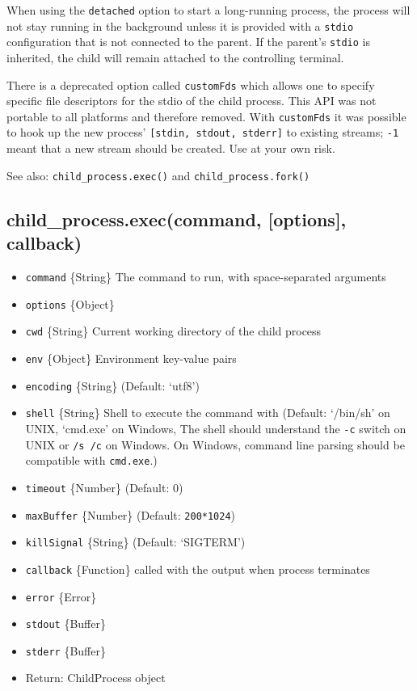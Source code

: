 When using the \texttt{detached} option to start a long-running process,
the process will not stay running in the background unless it is
provided with a \texttt{stdio} configuration that is not connected to
the parent. If the parent's \texttt{stdio} is inherited, the child will
remain attached to the controlling terminal.

There is a deprecated option called \texttt{customFds} which allows one
to specify specific file descriptors for the stdio of the child process.
This API was not portable to all platforms and therefore removed. With
\texttt{customFds} it was possible to hook up the new process'
\texttt{{[}stdin, stdout, stderr{]}} to existing streams; \texttt{-1}
meant that a new stream should be created. Use at your own risk.

See also: \texttt{child\_process.exec()} and
\texttt{child\_process.fork()}

\subsection{child\_process.exec(command, {[}options{]},
callback)}\label{childux5fprocess.execcommand-options-callback}

\begin{itemize}
\itemsep1pt\parskip0pt
\item
  \texttt{command} \{String\} The command to run, with space-separated
  arguments
\item
  \texttt{options} \{Object\}
\item
  \texttt{cwd} \{String\} Current working directory of the child process
\item
  \texttt{env} \{Object\} Environment key-value pairs
\item
  \texttt{encoding} \{String\} (Default: `utf8')
\item
  \texttt{shell} \{String\} Shell to execute the command with (Default:
  `/bin/sh' on UNIX, `cmd.exe' on Windows, The shell should understand
  the \texttt{-c} switch on UNIX or \texttt{/s /c} on Windows. On
  Windows, command line parsing should be compatible with
  \texttt{cmd.exe}.)
\item
  \texttt{timeout} \{Number\} (Default: 0)
\item
  \texttt{maxBuffer} \{Number\} (Default: \texttt{200*1024})
\item
  \texttt{killSignal} \{String\} (Default: `SIGTERM')
\item
  \texttt{callback} \{Function\} called with the output when process
  terminates
\item
  \texttt{error} \{Error\}
\item
  \texttt{stdout} \{Buffer\}
\item
  \texttt{stderr} \{Buffer\}
\item
  Return: ChildProcess object
\end{itemize}


